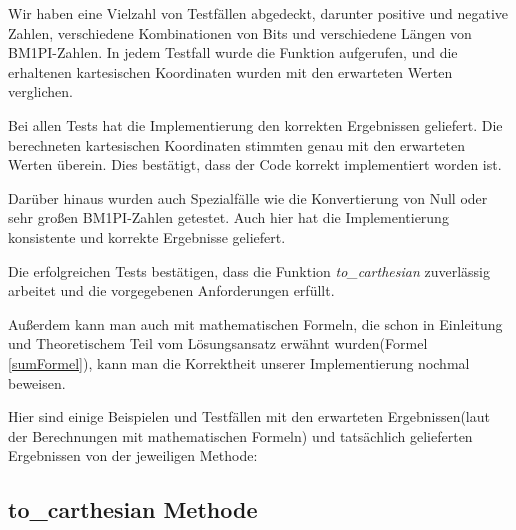 \documentclass[course=erap]{aspdoc}
\begin{document}
    Wir haben eine Vielzahl von Testfällen abgedeckt, darunter positive und negative Zahlen, verschiedene Kombinationen von Bits und verschiedene Längen von BM1PI-Zahlen. In jedem Testfall wurde die Funktion aufgerufen, und die erhaltenen kartesischen Koordinaten wurden mit den erwarteten Werten verglichen.

    Bei allen Tests hat die Implementierung den korrekten Ergebnissen geliefert. Die berechneten kartesischen Koordinaten stimmten genau mit den erwarteten Werten überein. Dies bestätigt, dass der Code korrekt implementiert worden ist.

    Darüber hinaus wurden auch Spezialfälle wie die Konvertierung von Null oder sehr großen BM1PI-Zahlen getestet. Auch hier hat die Implementierung konsistente und korrekte Ergebnisse geliefert.

    Die erfolgreichen Tests bestätigen, dass die Funktion \textit{to\_carthesian} zuverlässig arbeitet und die vorgegebenen Anforderungen erfüllt.

    Außerdem kann man auch mit mathematischen Formeln, die schon in Einleitung und Theoretischem Teil vom Lösungsansatz erwähnt wurden(Formel \ref{sumFormel}), kann man die Korrektheit unserer Implementierung nochmal beweisen.

    Hier sind einige Beispielen und Testfällen mit den erwarteten Ergebnissen(laut der Berechnungen mit mathematischen Formeln) und tatsächlich gelieferten Ergebnissen von der jeweiligen Methode:

    \subsection{to\_carthesian Methode}

\end{document}

